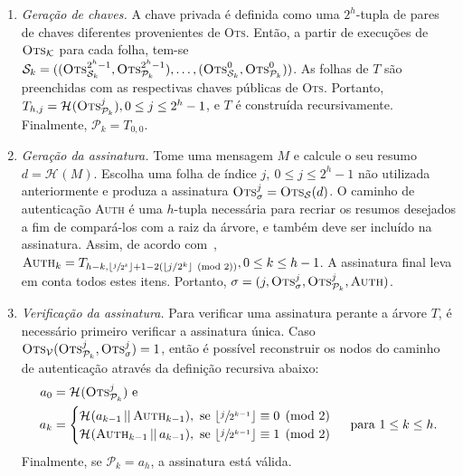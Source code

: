 \documentclass[12pt]{report}
\newcommand{\pk}{\mathcal{P}_k}
\newcommand{\sk}{\mathcal{S}_k}
\newcommand{\hash}[2][]{\mathcal{H}^{#1}(#2)}
\newcommand{\concat}{\, \vert \vert \,}
\begin{document}
\begin{enumerate}

  \item[] \emph{Geração de chaves.} A chave privada é definida como uma
      $2^{h}$-tupla de pares de chaves diferentes provenientes de \textsc{Ots}.
        Então, a partir de execuções de $\textsc{Ots}_\mathcal{K}$ para cada
        folha, tem-se $\sk{} = ((\textsc{Ots}_{\sk{}}^{2^{h} - 1},
        \textsc{Ots}_{\pk{}}^{2^{h} - 1}), \dots, (\textsc{Ots}_{\sk{}}^{0},
        \textsc{Ots}_{\pk{}}^{0}))$. As folhas de $T$ são preenchidas com as
        respectivas chaves públicas de \textsc{Ots}. Portanto, $T_{h, j} =
        \hash{\textsc{Ots}_{\pk{}}^{j}}, 0 \leq j \leq 2^{h} - 1$,
        e $T$ é construída recursivamente. Finalmente, $\pk{} = T_{0,0}$.

  \item[] \emph{Geração da assinatura.} Tome uma mensagem $M$ e calcule o seu
      resumo $d = \hash{M}$. Escolha uma folha de índice $j, \: 0 \leq j \leq 2^h - 1$ não utilizada
        anteriormente e produza a assinatura $\textsc{Ots}_\sigma^{j} =
        \textsc{Ots}_\mathcal{S}(d)$. O caminho de autenticação \textsc{Auth} é
        uma $h$-tupla necessária para recriar os resumos desejados a fim de
        compará-los com a raiz da árvore, e também deve ser incluído na
        assinatura. Assim, de acordo com~\cite{Bernstein:2008:PQC:1522375},
        $\textsc{Auth}_k = T_{h - k, \lfloor \sfrac{j}{2^k} \rfloor + 1 - 2
        (\lfloor j/2^k \rfloor \pmod{2})}, 0 \leq k \leq h - 1$. A assinatura
        final leva em conta todos estes itens. Portanto, $\sigma = (j,
        \textsc{Ots}_\sigma^{j}, \textsc{Ots}_{\pk{}}^{j}, \textsc{Auth})$.

  \item[] \emph{Verificação da assinatura.} Para verificar uma assinatura
      perante a árvore $T$, é necessário primeiro verificar a assinatura única.
        Caso $\textsc{Ots}_{\mathcal{V}}(\textsc{Ots}_{\pk{}}^{j},
        \textsc{Ots}_{\sigma}^{j}) = 1$, então é possível reconstruir os nodos
        do caminho de autenticação através da definição recursiva abaixo:
        \begin{equation}
          \begin{split}
            a_{0} &= \hash{\textsc{Ots}_{\pk{}}^{j}} \text{ e } \\
            a_{k} &=
            \begin{cases}
              \hash{a_{k - 1} \concat \textsc{Auth}_{k - 1}}, \text{ se }
                \lfloor \sfrac{j}{2^{k - 1}} \rfloor \equiv 0 \pmod{2} \\
              \hash{\textsc{Auth}_{k - 1} \concat a_{k - 1}}, \text{ se }
                \lfloor \sfrac{j}{2^{k - 1}} \rfloor \equiv 1 \pmod{2} \\
            \end{cases} \text{ para } 1 \leq k \leq h.
          \end{split}
        \end{equation}
        Finalmente, se $\pk{} = a_{h}$, a assinatura está válida.

\end{enumerate}
\end{document}
